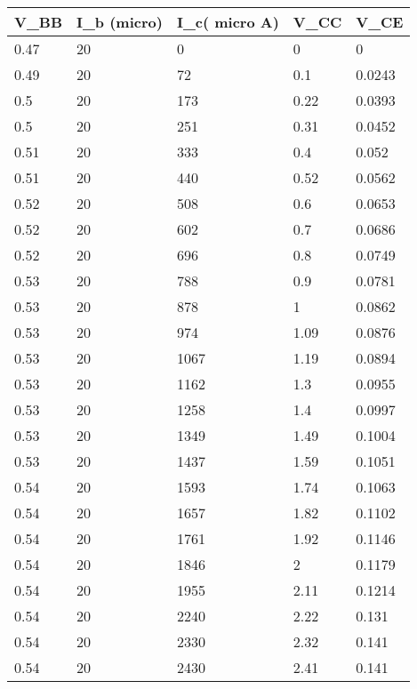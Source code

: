 \documentclass{scrartcl}
\newcommand{\1}{\mathbbm{1}}
\begin{document}
    \begin{table}[!ht]
        \centering
        \begin{tabular}{|l|l|l|l|l|}
        \hline
            \textbf{V\_BB} & \textbf{I\_b (micro)} & \textbf{I\_c( micro A)} & \textbf{V\_CC} & \textbf{V\_CE} \\ \hline
            0.47 & 20 & 0 & 0 & 0 \\ \hline
            0.49 & 20 & 72 & 0.1 & 0.0243 \\ \hline
            0.5 & 20 & 173 & 0.22 & 0.0393 \\ \hline
            0.5 & 20 & 251 & 0.31 & 0.0452 \\ \hline
            0.51 & 20 & 333 & 0.4 & 0.052 \\ \hline
            0.51 & 20 & 440 & 0.52 & 0.0562 \\ \hline
            0.52 & 20 & 508 & 0.6 & 0.0653 \\ \hline
            0.52 & 20 & 602 & 0.7 & 0.0686 \\ \hline
            0.52 & 20 & 696 & 0.8 & 0.0749 \\ \hline
            0.53 & 20 & 788 & 0.9 & 0.0781 \\ \hline
            0.53 & 20 & 878 & 1 & 0.0862 \\ \hline
            0.53 & 20 & 974 & 1.09 & 0.0876 \\ \hline
            0.53 & 20 & 1067 & 1.19 & 0.0894 \\ \hline
            0.53 & 20 & 1162 & 1.3 & 0.0955 \\ \hline
            0.53 & 20 & 1258 & 1.4 & 0.0997 \\ \hline
            0.53 & 20 & 1349 & 1.49 & 0.1004 \\ \hline
            0.53 & 20 & 1437 & 1.59 & 0.1051 \\ \hline
            0.54 & 20 & 1593 & 1.74 & 0.1063 \\ \hline
            0.54 & 20 & 1657 & 1.82 & 0.1102 \\ \hline
            0.54 & 20 & 1761 & 1.92 & 0.1146 \\ \hline
            0.54 & 20 & 1846 & 2 & 0.1179 \\ \hline
            0.54 & 20 & 1955 & 2.11 & 0.1214 \\ \hline
            0.54 & 20 & 2240 & 2.22 & 0.131 \\ \hline
            0.54 & 20 & 2330 & 2.32 & 0.141 \\ \hline
            0.54 & 20 & 2430 & 2.41 & 0.141 \\ \hline

\end{tabular}
\end{table}
\end{document}
